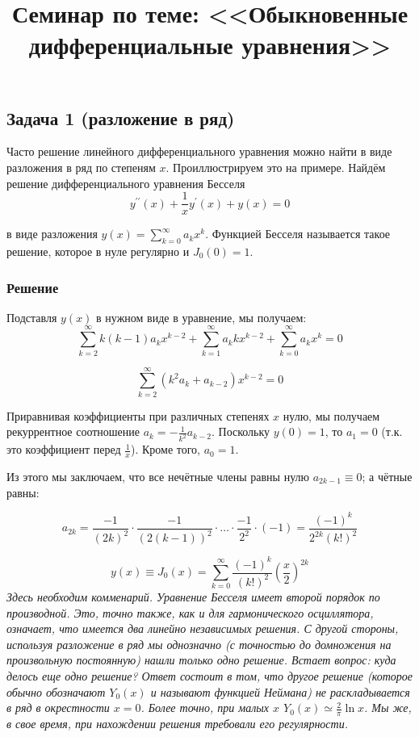 \documentclass[a4paper,12pt]{article}
\begin{document}
\title{Семинар по теме: <<Обыкновенные дифференциальные уравнения>>}
\maketitle

\subsection*{Задача 1 (разложение в ряд)}

Часто решение линейного дифференциального уравнения можно найти в
виде разложения в ряд по степеням $x$. Проиллюстрируем это на примере.
Найдём решение дифференциального уравнения Бесселя
\[
y^{\prime\prime}(x)+\frac{1}{x}y^{\prime}(x)+y(x)=0
\]

\noindent
в виде разложения $y(x)=\sum_{k=0}^{\infty}a_{k}x^{k}$. Функцией Бесселя называется
такое решение, которое в нуле регулярно и $J_{0}(0)=1$.


\subsubsection*{Решение}

Подставля $y(x)$ в нужном виде в уравнение, мы получаем:
\[
\sum_{k=2}^{\infty}k(k-1)a_{k}x^{k-2}+\sum_{k=1}^{\infty}a_{k}kx^{k-2}+\sum_{k=0}^{\infty}a_{k}x^{k}=0
\]


\[
\sum_{k=2}^{\infty}(k^{2}a_{k}+a_{k-2})x^{k-2}=0
\]

\noindent
Приравнивая коэффициенты при различных степенях $x$ нулю, мы получаем
рекуррентное соотношение $a_{k}=-\frac{1}{k^{2}}a_{k-2}$. Поскольку $y(0)=1$, то $a_1=0$ (т.к. это коэффициент перед $\frac{1}{x}$). Кроме того, $a_0=1$.

\noindent
Из этого мы заключаем, что все нечётные члены равны нулю $a_{2k-1}\equiv0$;
а чётные равны:

\[
a_{2k}=\frac{-1}{(2k)^{2}}\cdot\frac{-1}{(2(k-1))^{2}}\cdot\dots\cdot\frac{-1}{2^{2}}\cdot(-1)=\frac{(-1)^{k}}{2^{2k}(k!)^{2}}
\]


\[
y(x)\equiv J_{0}(x)=\sum_{k=0}^{\infty}\frac{(-1)^{k}}{(k!)^{2}}\left(\frac{x}{2}\right)^{2k}
\]
\noindent
\textit{Здесь необходим комменарий. Уравнение Бесселя имеет второй порядок по производной. Это, точно также, как и для гармонического осциллятора, означает, что имеется два линейно независимых решения. С другой стороны, используя разложение в ряд мы однозначно (с точностью до домножения на произвольную постоянную) нашли только одно решение. Встает вопрос: куда делось еще одно решение? Ответ состоит в том, что другое решение (которое обычно обозначают $Y_0(x)$ и называют функцией Неймана) не раскладывается в ряд в окрестности $x=0$. Более точно, при малых $x$ $Y_0(x)\simeq \frac{2}{\pi}\ln x$. Мы же, в свое время, при нахождении решения требовали его регулярности.}
\end{document}
